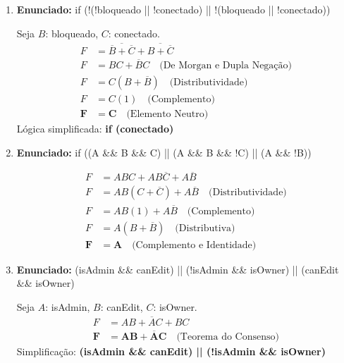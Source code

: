 \documentclass[12pt]{article}
\begin{document}
\begin{enumerate}[label=\textbf{\arabic*.}]
\item \textbf{Enunciado:} if (!(!bloqueado || !conectado) || !(bloqueado || !conectado))
\begin{solucao}
Seja $B$: bloqueado, $C$: conectado.
\begin{align*}
    F &= \overline{\overline{B} + \overline{C}} + \overline{B + \overline{C}} \\
    F &= BC + \overline{B}C \quad \text{(De Morgan e Dupla Negação)} \\
    F &= C(B + \overline{B}) \quad \text{(Distributividade)} \\
    F &= C(1) \quad \text{(Complemento)} \\
    \mathbf{F} &= \mathbf{C} \quad \text{(Elemento Neutro)}
\end{align*}
Lógica simplificada: \textbf{if (conectado)}
\end{solucao}

\item \textbf{Enunciado:} if ((A \&\& B \&\& C) || (A \&\& B \&\& !C) || (A \&\& !B))
\begin{solucao}
\begin{align*}
    F &= ABC + AB\overline{C} + A\overline{B} \\
    F &= AB(C + \overline{C}) + A\overline{B} \quad \text{(Distributividade)} \\
    F &= AB(1) + A\overline{B} \quad \text{(Complemento)} \\
    F &= A(B + \overline{B}) \quad \text{(Distributiva)} \\
    \mathbf{F} &= \mathbf{A} \quad \text{(Complemento e Identidade)}
\end{align*}
\end{solucao}

\item \textbf{Enunciado:} (isAdmin \&\& canEdit) || (!isAdmin \&\& isOwner) || (canEdit \&\& isOwner)
\begin{solucao}
Seja $A$: isAdmin, $B$: canEdit, $C$: isOwner.
\begin{align*}
    F &= AB + \overline{A}C + BC \\
    \mathbf{F} &= \mathbf{AB + \overline{A}C} \quad \text{(Teorema do Consenso)}
\end{align*}
Simplificação: \textbf{(isAdmin \&\& canEdit) || (!isAdmin \&\& isOwner)}
\end{solucao}


\end{enumerate}
\end{document}
